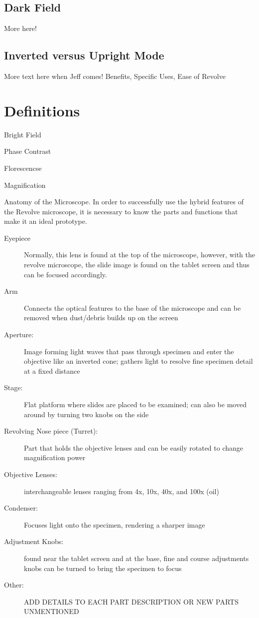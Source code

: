 \documentclass[12pt]{../SOP2}
\begin{document}
\subsection*{Dark Field}

\NP More here!

\subsection*{Inverted versus Upright Mode}

More text here when Jeff comes!
Benefits, Specific Uses, Ease of Revolve

\section{Definitions}

\NP Bright Field

\NP Phase Contrast

\NP Florescencse

\NP Magnification

\NP Anatomy of the Microscope. In order to successfully use the hybrid features of the Revolve microscope, it is necessary to know the parts and functions that make it an ideal prototype.

\begin{description}
  \item[Eyepiece] Normally, this lens is found  at the top of the microscope, however, with the revolve microscope, the slide image is found on the tablet screen and thus can be focused accordingly.
  \item[Arm] Connects the optical features to the base of the microscope and can be removed when dust/debris builds up on the screen 
  \item[Aperture:] Image forming light waves that pass through specimen and enter the objective like an inverted cone; gathers light to resolve fine specimen detail at a fixed distance
  \item[Stage:] Flat platform where slides are placed to be examined; can also be moved around by turning two knobs on the side 
  \item[Revolving Nose piece (Turret):] Part that holds the objective lenses and can be easily rotated to change magnification power
  \item[Objective Lenses:] interchangeable lenses ranging from 4x, 10x, 40x, and 100x (oil)
  \item[Condenser:] Focuses light onto the specimen, rendering a sharper image
  \item[Adjustment Knobs:] found near the tablet screen and at the base, fine and course adjustments knobs can be turned to bring the specimen to focus 

\item[Other:] ADD DETAILS TO EACH PART DESCRIPTION OR NEW PARTS UNMENTIONED 

\end{description}
\end{document}
